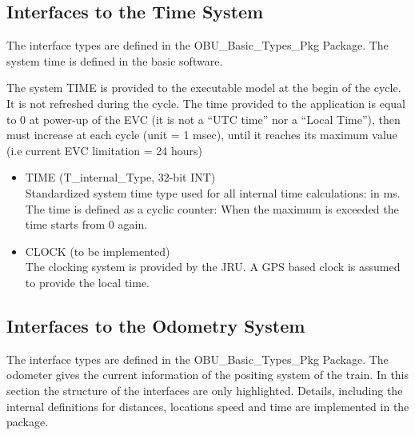 \subsection{Interfaces to the Time System}
The interface types are defined in the OBU\_Basic\_Types\_Pkg Package. The system time is defined in the basic software.

The system TIME is provided to the executable model at the begin of the cycle. It is not refreshed during the cycle. The time provided to the application is equal to 0 at power-up of the EVC (it is not a “UTC time” nor a “Local
Time”), then must increase at each cycle (unit = 1 msec), until it reaches its maximum value (i.e current EVC
limitation = 24 hours)

\begin{itemize}
\item TIME (T\_internal\_Type, 32-bit INT)\\
Standardized system time type used for all internal time calculations: in ms. The time is defined as a cyclic counter: When the maximum is exceeded the time starts from 0 again. 

\item CLOCK (to be implemented)\\
The clocking system is provided by the JRU. A GPS based clock is assumed to provide the local time.

\end{itemize}

\subsection{Interfaces to the Odometry System}
The interface types are defined in the OBU\_Basic\_Types\_Pkg Package. 
The odometer gives the current information of the positing system of the train. In this section the structure of the interfaces are only highlighted. Details, including the internal definitions for distances, locations speed and time are implemented in the package. 

